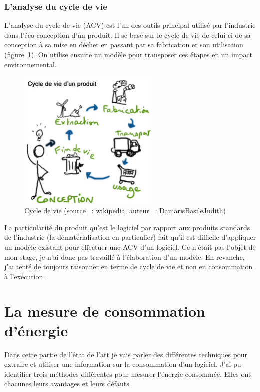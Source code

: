 \documentclass[a4paper, 11pt]{report}
\begin{document}
			\subsubsection{L'analyse du cycle de vie}
L'analyse du cycle de vie (ACV) est l'un des outils principal utilisé par l'industrie dans l'éco-conception d'un produit. Il se base sur le cycle de vie de celui-ci de sa conception à sa mise en déchet en passant par sa fabrication et son utilisation (figure~\ref{CdV}). On utilise ensuite un modèle pour transposer ces étapes en un impact environnemental.

\begin{figure}
	\centering
	\includegraphics[width=0.6\textwidth]{figures/Cycle-de-vie}
	\caption{Cycle de vie (source ~: wikipedia, auteur ~: DamarisBasileJudith)}
	\label{CdV}
\end{figure}

La particularité du produit qu'est le logiciel par rapport aux produits standards de l'industrie (la dématérialisation en particulier) fait qu'il est difficile d'appliquer un modèle existant pour effectuer une ACV d'un logiciel. Ce n'était pas l'objet de mon stage, je n'ai donc pas travaillé à l'élaboration d'un modèle. En revanche, j'ai tenté de toujours raisonner en terme de cycle de vie et non en consommation à l'exécution.
			
		
	\section{La mesure de consommation d'énergie}
Dans cette partie de l'état de l'art je vais parler des différentes techniques pour extraire et utiliser une information sur la consommation d'un logiciel. J'ai pu identifier trois méthodes différentes pour mesurer l'énergie consommée. Elles ont chacunes leurs avantages et leurs défauts.
\end{document}
